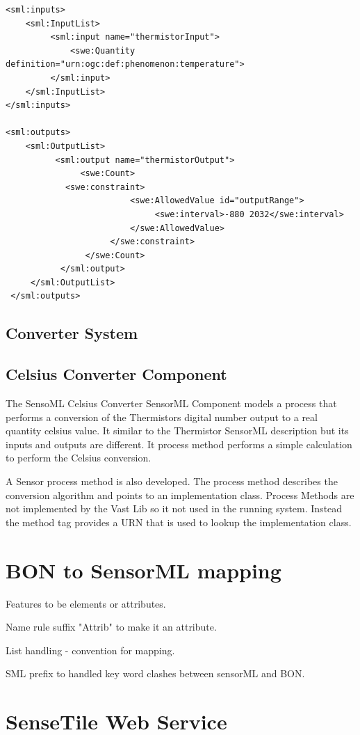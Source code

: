 \documentclass[]{final_report}
\begin{document}
\begin{lstlisting}
<sml:inputs>
    <sml:InputList>
         <sml:input name="thermistorInput">
             <swe:Quantity definition="urn:ogc:def:phenomenon:temperature">
         </sml:input>
    </sml:InputList>
</sml:inputs>

<sml:outputs>
    <sml:OutputList>
          <sml:output name="thermistorOutput">
               <swe:Count>
	        <swe:constraint>
                         <swe:AllowedValue id="outputRange">
                              <swe:interval>-880 2032</swe:interval>
                         </swe:AllowedValue>
                     </swe:constraint>
                </swe:Count>
           </sml:output>
     </sml:OutputList>
 </sml:outputs>
\end{lstlisting}

\subsection{Converter System}
\subsection{Celsius Converter Component}

The SensoML Celsius Converter SensorML Component  models a process that performs a conversion of the Thermistors digital number output to a real quantity celsius value. It similar to the Thermistor SensorML description but its inputs and outputs are different. It process method performs a simple calculation to perform the Celsius conversion.

A Sensor process method is also developed. The process method describes the conversion algorithm and points to an implementation class. Process Methods are not implemented by the Vast Lib so it not used in the running system. Instead the method tag provides a URN that is used to lookup the implementation class.

\section{BON to SensorML mapping}
Features to be elements or attributes.

Name rule suffix "Attrib" to make it an attribute.

List handling - convention for mapping.

SML prefix to handled key word clashes between sensorML and BON.


\section{SenseTile Web Service}
\end{document}
